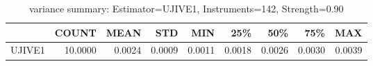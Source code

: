 \begin{table}[ht]
\centering
\caption{variance summary: Estimator=UJIVE1, Instruments=142, Strength=0.90}
\begin{tabular}{lrrrrrrrr}
\toprule
 & COUNT & MEAN & STD & MIN & 25\% & 50\% & 75\% & MAX \\
\midrule
UJIVE1 & 10.0000 & 0.0024 & 0.0009 & 0.0011 & 0.0018 & 0.0026 & 0.0030 & 0.0039 \\
\bottomrule
\end{tabular}
\end{table}
